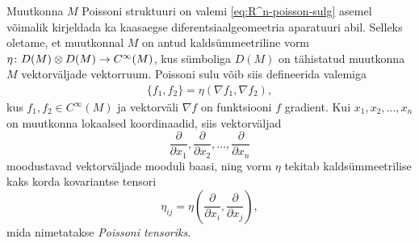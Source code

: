 
Muutkonna $M$ Poissoni struktuuri on valemi \eqref{eq:R^n-poisson-sulg}
asemel võimalik kirjeldada ka kaasaegse diferentsiaalgeomeetria
aparatuuri abil. Selleks oletame, et muutkonnal $M$ on antud kaldsümmeetriline vorm $\eta \colon D(M) \otimes D(M) \to C^\infty(M)$,
kus sümboliga $D(M)$ on tähistatud muutkonna $M$ vektorväljade vektorruum.
Poissoni sulu võib siis defineerida valemiga
\begin{align}\label{eq:poisson-brac-nabla}
    \{ f_1, f_2 \} = \eta(\nabla f_1, \nabla f_2),
\end{align}
kus $f_1, f_2 \in C^\infty(M)$ ja vektorväli $\nabla f$ on
funktsiooni $f$ gradient. Kui $x_1, x_2, \dots, x_n$ on muutkonna
lokaalsed koordinaadid, siis vektorväljad
\[
    \frac{\partial}{\partial x_1},
    \frac{\partial}{\partial x_2},
    \dots,
    \frac{\partial}{\partial x_n}
\]
moodustavad vektorväljade mooduli
baasi, ning vorm $\eta$ tekitab kaldsümmeetrilise kaks korda kovariantse
tensori
\[
    \eta_{ij} = \eta\left(
        \frac{\partial}{\partial x_i}, \frac{\partial}{\partial x_j}
    \right),
\]
mida nimetatakse \emph{Poissoni tensoriks}.

